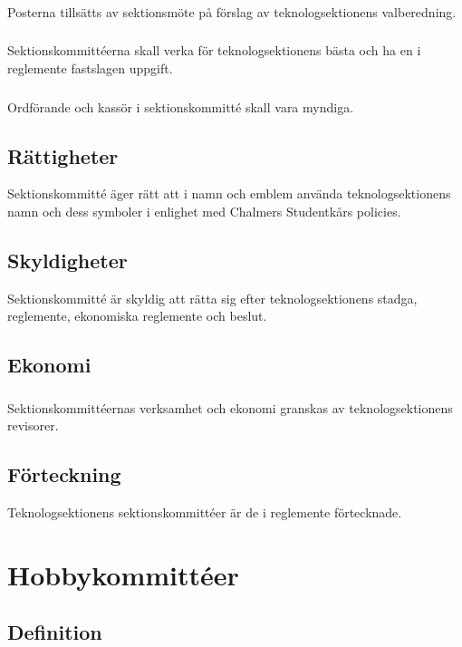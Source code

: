 \documentclass[a4paper]{dtek}
\begin{document}
\subsubsection{}
Posterna tillsätts av sektionsmöte på förslag av teknologsektionens valberedning.
\subsubsection{}
Sektionskommittéerna skall verka för teknologsektionens bästa och ha en i reglemente fastslagen uppgift.
\subsubsection{}
Ordförande och kassör i sektionskommitté skall vara myndiga.
\subsection{Rättigheter}
Sektionskommitté äger rätt att i namn och emblem använda teknologsektionens namn och dess symboler i enlighet med Chalmers Studentkårs policies.
\subsection{Skyldigheter}
Sektionskommitté är skyldig att rätta sig efter teknologsektionens stadga, reglemente, ekonomiska reglemente och beslut.
\subsection{Ekonomi}
\subsubsection{}
Sektionskommittéernas verksamhet och ekonomi granskas av teknologsektionens revisorer.
\subsection{Förteckning}
Teknologsektionens sektionskommittéer är de i reglemente förtecknade.
\newpage

\section{Hobbykommittéer}
\subsection{Definition}
\end{document}
